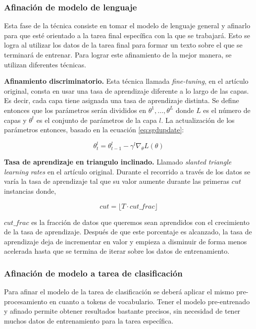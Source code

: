 \subsubsection{Afinación de modelo de lenguaje}
\label{lmftune}

Esta fase de la técnica consiste en tomar el modelo de lenguaje general y afinarlo para que esté orientado a la tarea final específica con la que se trabajará. Esto se logra al utilizar los datos de la tarea final para formar un texto sobre el que se terminará de entrenar. Para lograr este afinamiento de la mejor manera, se utilizan diferentes técnicas.

\textbf{Afinamiento discriminatorio.} Esta técnica llamada \textit{fine-tuning}, en el artículo original, consta en usar una tasa de aprendizaje diferente a lo largo de las capas. Es decir, cada capa tiene asignada una tasa de aprendizaje distinta. Se define entonces que los parámetros serán divididos en ${\theta^1, \ldots, \theta^L}$ donde $L$ es el número de capas y $\theta^t$ es el conjunto de parámetros de la capa $l$. La actualización de los parámetros entonces, basado en la ecuación \ref{eq:sgdupdate}:

\begin{equation}
\label{eq:discupdate}
\theta_t^l = \theta_{t-1}^l - \gamma^l \nabla_{\theta} L(\theta)
\end{equation}

\textbf{Tasa de aprendizaje en triangulo inclinado.} Llamado \emph{slanted triangle learning rates} en el artículo original. Durante el recorrido a través de los datos se varía la tasa de aprendizaje tal que su valor aumente durante las primeras $cut$ instancias donde,

$$ cut = \lfloor T \cdot cut\_frac \rfloor$$

$cut\_frac$ es la fracción de datos que queremos sean aprendidos con el crecimiento de la tasa de aprendizaje. Después de que este porcentaje es alcanzado, la tasa de aprendizaje deja de incrementar en valor y empieza a disminuir de forma menos acelerada hasta que se termina de iterar sobre los datos de entrenamiento.

\subsubsection{Afinación de modelo a tarea de clasificación}

Para afinar el modelo de la tarea de clasificación se deberá aplicar el mismo pre-procesamiento en cuanto a tokens de vocabulario. Tener el modelo pre-entrenado y afinado permite obtener resultados bastante precisos, sin necesidad de tener muchos datos de entrenamiento para la tarea específica.

